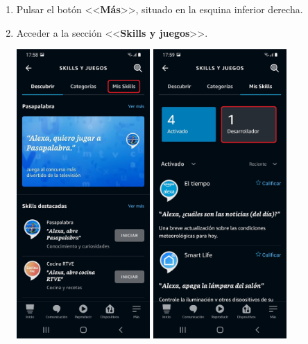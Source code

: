 \documentclass[11pt,spanish,listoffigures,listoftables,table,hyphens,dvipsnames]{tfgetsinf}
\begin{document}
\begin{enumerate}
   \item Pulsar el botón <<\textbf{Más}>>, situado en la esquina inferior derecha.
   \item Acceder a la sección <<\textbf{Skills y juegos}>>.
  
   \raggedbottom

   \includegraphics[width=0.4\textwidth]{activate-skill-3.jpg}
   \includegraphics[width=0.4\textwidth]{activate-skill-4.jpg}


\end{enumerate}
\end{document}

